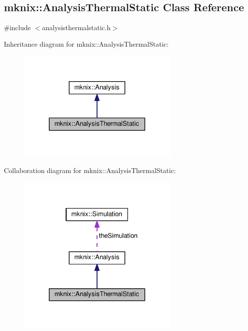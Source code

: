 \hypertarget{classmknix_1_1_analysis_thermal_static}{}\subsection{mknix\+:\+:Analysis\+Thermal\+Static Class Reference}
\label{classmknix_1_1_analysis_thermal_static}


{\ttfamily \#include $<$analysisthermalstatic.\+h$>$}



Inheritance diagram for mknix\+:\+:Analysis\+Thermal\+Static\+:\nopagebreak
\begin{figure}[H]
\begin{center}
\leavevmode
\includegraphics[width=227pt]{d1/df3/classmknix_1_1_analysis_thermal_static__inherit__graph}
\end{center}
\end{figure}


Collaboration diagram for mknix\+:\+:Analysis\+Thermal\+Static\+:\nopagebreak
\begin{figure}[H]
\begin{center}
\leavevmode
\includegraphics[width=227pt]{d1/d71/classmknix_1_1_analysis_thermal_static__coll__graph}
\end{center}
\end{figure}
